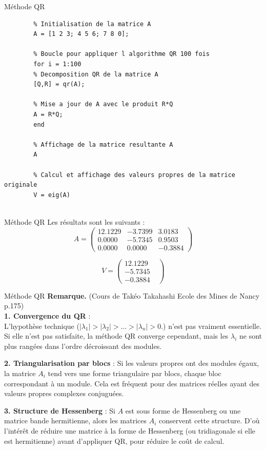 \documentclass[french, 10pt]{beamer}
\theoremstyle{definition}
\begin{document}
\begin{frame}[fragile]{Méthode QR}
	\begin{lstlisting}
		% Initialisation de la matrice A
		A = [1 2 3; 4 5 6; 7 8 0];
		
		% Boucle pour appliquer l algorithme QR 100 fois
		for i = 1:100
		% Decomposition QR de la matrice A
		[Q,R] = qr(A);
		
		% Mise a jour de A avec le produit R*Q
		A = R*Q;
		end
		
		% Affichage de la matrice resultante A
		A
		
		% Calcul et affichage des valeurs propres de la matrice originale
		V = eig(A)
		
	\end{lstlisting}
	
\end{frame}




\begin{frame}{Méthode QR}
	Les résultats sont les suivants :
	\[
	A = \begin{pmatrix}
		12.1229 & -3.7399 & 3.0183 \\
		0.0000  & -5.7345  & 0.9503 \\
		0.0000  & 0.0000  & -0.3884
	\end{pmatrix}
	\]
	
	\[
	V = \begin{pmatrix}
		12.1229 & \\
		-5.7345 & \\
		-0.3884 &
	\end{pmatrix}
	\]
	
\end{frame}


\begin{frame}{Méthode QR}
	\textbf{Remarque.} (Cours de Takéo Takahashi Ecole des Mines de Nancy p.175)\\
	\textbf{1. Convergence du QR} : \\L'hypothèse technique ($
	|\lambda_1| > |\lambda_2| > \dots > |\lambda_n| > 0.$) n'est pas vraiment essentielle. 
	Si elle n'est pas satisfaite, la méthode QR converge cependant, 
	mais les $\lambda_i$ ne sont plus rangées dans l'ordre décroissant des modules.
	
	
	\textbf{2. Triangularisation par blocs} : Si les valeurs propres ont des modules égaux, la matrice \(A_i\) tend vers une forme triangulaire par blocs, chaque bloc correspondant à un module. Cela est fréquent pour des matrices réelles ayant des valeurs propres complexes conjuguées.
	
	\textbf{3. Structure de Hessenberg} : Si \( A \) est sous forme de Hessenberg ou une matrice bande hermitienne, alors les matrices \( A_i \) conservent cette structure. D’où l’intérêt de réduire une matrice à la forme de Hessenberg (ou tridiagonale si elle est hermitienne) avant d'appliquer QR, pour réduire le coût de calcul.
	
\end{frame}
\end{document}
